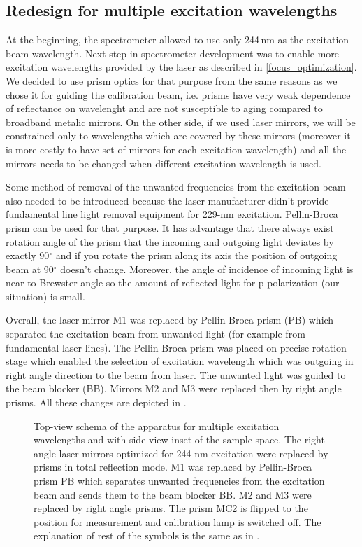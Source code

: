 \subsection{Redesign for multiple excitation wavelengths}

At the beginning, the spectrometer allowed to use only 244\,nm as the
excitation beam wavelength. Next step in spectrometer development was to
enable more excitation wavelengths provided by the laser as described in
\cref{focus_optimization}.
We decided to use prism optics for that purpose from the same reasons as we
chose it for guiding the calibration beam, i.e. prisms have very weak
dependence of reflectance on wavelenght and are not susceptible to aging
compared to broadband metalic mirrors. On the other side, if we used laser
mirrors, we will be constrained only to wavelengths which are covered by
these mirrors (moreover it is more costly to have set of mirrors for each
excitation wavelength) and all the mirrors needs to be changed when different
excitation wavelength is used.

Some method of removal of the unwanted frequencies from the excitation beam
also needed to be introduced because the laser manufacturer didn't provide
fundamental line light removal equipment for 229-nm excitation. Pellin-Broca
prism can be used for that purpose. It has advantage that there always exist
rotation angle of the prism that the incoming and outgoing light deviates by
exactly 90$^\circ$ and if you rotate the prism along its axis the position of
outgoing beam at 90$^\circ$ doesn't change. Moreover, the angle of incidence of
incoming light is near to Brewster angle so the amount of reflected light for
p-polarization (our situation) is small.

Overall, the laser mirror M1 was replaced by Pellin-Broca prism (PB) which
separated the excitation beam from unwanted light (for example from fundamental
laser lines). The Pellin-Broca prism was placed on precise rotation stage
which enabled the selection of excitation wavelength which was outgoing in
right angle direction to the beam from laser. The unwanted light was guided to
the beam blocker (BB). Mirrors M2 and M3 were replaced then by right angle
prisms. All these changes are depicted in
.

\begin{figure}
	\centering
	
	\caption{Top-view schema of the apparatus for multiple excitation wavelengths
		and with side-view inset of the sample space. The right-angle laser
		mirrors optimized for 244-nm excitation were replaced by prisms in total
		reflection mode. M1 was replaced by Pellin-Broca prism PB which separates
		unwanted frequencies from the excitation beam and sends them to the beam
		blocker BB. M2 and M3 were replaced by right angle prisms. The prism MC2 is
		flipped to the position for measurement and calibration lamp is switched
		off. The explanation of rest of the symbols is the same as in
		.}
	\label{\figlabel{multiple_excitations:apparatus_schema}}
\end{figure}

